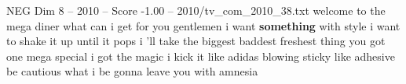 \begin{textsample}{NEG Dim 8 – 2010 – Score -1.00 – 2010/tv\_com\_2010\_38.txt}  \label{ex:f8_neg_042}
welcome to the mega diner what can i get for you gentlemen i want \textbf{something} with style i want to shake it up until it pops i 'll take the biggest baddest freshest thing you got one mega special i got the magic i kick it like adidas blowing sticky like adhesive be cautious what i be gonna leave you with amnesia

\end{textsample}
